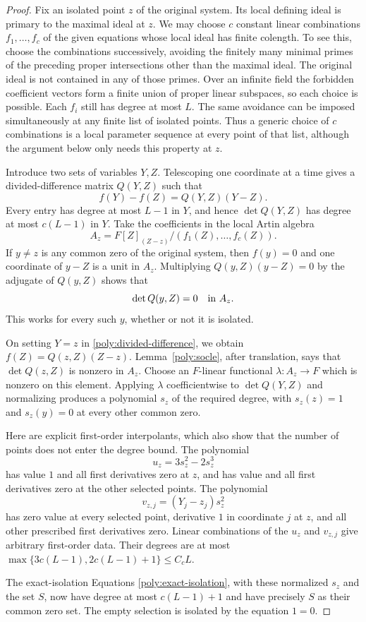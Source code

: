 \begin{proof}
Fix an isolated point $z$ of the original system.  Its local defining
ideal is primary to the maximal ideal at $z$.  We may choose $c$ constant
linear combinations $f_1,\ldots,f_c$ of the given equations whose local
ideal has finite colength.  To see this, choose the combinations
successively, avoiding the finitely many minimal primes of the preceding
proper intersections other than the maximal ideal.  The original ideal
is not contained in any of those primes.  Over an infinite field the
forbidden coefficient vectors form a finite union of proper linear
subspaces, so each choice is possible.  Each $f_i$ still has degree at
most $L$.  The same avoidance can be imposed simultaneously at any
finite list of isolated points.  Thus a generic choice of $c$
combinations is a local parameter sequence at every point of that
list, although the argument below only needs this property at $z$.

Introduce two sets of variables $Y,Z$.  Telescoping one coordinate at a
time gives a divided-difference matrix $Q(Y,Z)$ such that
\begin{equation}\label{poly:divided-difference}
 f(Y)-f(Z)=Q(Y,Z)(Y-Z).
\end{equation}
Every entry has degree at most $L-1$ in $Y$, and hence
$\det Q(Y,Z)$ has degree at most $c(L-1)$ in $Y$.  Take the coefficients
in the local Artin algebra
\[
 A_z=F[Z]_{(Z-z)}/(f_1(Z),\ldots,f_c(Z)).
\]
If $y\ne z$ is any common zero of the original system, then $f(y)=0$ and
one coordinate of $y-Z$ is a unit in $A_z$.  Multiplying
$Q(y,Z)(y-Z)=0$ by the adjugate of $Q(y,Z)$ shows that
\[
 \det Q(y,Z)=0\quad\hbox{in }A_z.
\]
This works for every such $y$, whether or not it is isolated.

On setting $Y=z$ in \eqref{poly:divided-difference}, we obtain
$f(Z)=Q(z,Z)(Z-z)$.  Lemma~\ref{poly:socle}, after translation, says
that $\det Q(z,Z)$ is nonzero in $A_z$.  Choose an $F$-linear functional
$\lambda:A_z\longrightarrow F$ which is nonzero on this element.
Applying $\lambda$ coefficientwise to $\det Q(Y,Z)$ and normalizing
produces a polynomial $s_z$ of the required degree, with $s_z(z)=1$ and
$s_z(y)=0$ at every other common zero.

Here are explicit first-order interpolants, which also show that the
number of points does not enter the degree bound.  The polynomial
\[
 u_z=3s_z^2-2s_z^3
\]
has value $1$ and all first derivatives zero at $z$, and has value and
all first derivatives zero at the other selected points.  The
polynomial
\[
 v_{z,j}=(Y_j-z_j)s_z^2
\]
has zero value at every selected point, derivative $1$ in coordinate $j$
at $z$, and all other prescribed first derivatives zero.  Linear
combinations of the $u_z$ and $v_{z,j}$ give arbitrary first-order data.
Their degrees are at most
$\max\{3c(L-1),2c(L-1)+1\}\le C_cL$.

The exact-isolation Equations \eqref{poly:exact-isolation}, with these
normalized $s_z$ and the set $S$, now have degree at most $c(L-1)+1$ and
have precisely $S$ as their common zero set.  The empty selection is
isolated by the equation $1=0$.
\end{proof}

